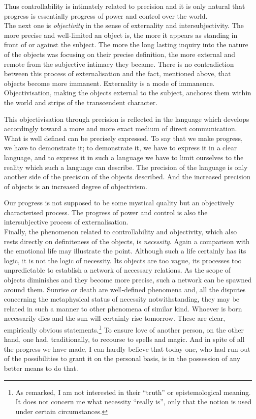 Thus controllability is intimately related to precision and it is only natural
that progress is essentially progress of power and control over the world.\\[1ex]
The next one is {\em objectivity} in the sense of externality and 
intersubjectivity. The more precise and well-limited an object is, the more it
appears as standing in front of or against the subject. The more the long
lasting inquiry into the nature of the objects was focusing on their precise
definition, the more external and remote from the subjective intimacy they 
became. There is no contradiction between this process of externalisation and
the fact, mentioned above, that objects become more immanent. Externality is
a mode of immanence. Objectivisation, making the objects external to the 
subject, anchores them within the world and strips of the transcendent
character.

This objectivisation through precision is reflected in the language which 
develops accordingly toward a more and more exact medium of direct 
communication. What is well defined can be precisely expressed. To say
that we make progress, we have to demonstrate it; to demonstrate it, we have
to express it in a clear language, and to express it in such a language we
have to limit ourselves to the reality which such a language can describe.
The precision of the language is only another side of the precision of the 
objects described. And the increased precision of objects is an increased
degree of objectivism. 

Our progress is not supposed to be some mystical
quality but an objectively characterised process. The progress of power and 
control is also the intersubjective process of externalisation.\\[1ex]
Finally, the phenomenon related to controllability and objectivity, which also
rests directly on definiteness of the objects, is {\em necessity}. Again a 
comparison with the emotional life may illustrate the point. Although such a
life certainly has its logic, it is not the logic of necessity. Its objects 
are too vague, its processes too unpredictable to establish a network of
necessary relations. As the scope of objects diminishes and they become more
precise, such a network can be spawned around them. Sunrise or death are
well-defined phenomena and, all the disputes concerning the metaphysical
status of necessity notwithstanding, they may be related in such a manner to
other phenomena of similar kind. Whoever is born necessarily dies and the sun
will certainly rise tomorrow. These are clear, empirically obvious 
statements.\footnote{As remarked, I am not interested in their ``truth'' or
epistemological meaning. It does not concern me what necessity ``really is'',
only that the notion is used under certain circumstances.} To ensure
love of another person, on the other hand, one had, traditionally, to recourse
to spells and magic. And in spite of all the progress we have made, I can 
hardly believe that today one, who had run out of the possibilities to grant
it on the personal basis, is in the possession of any better means to do that.

